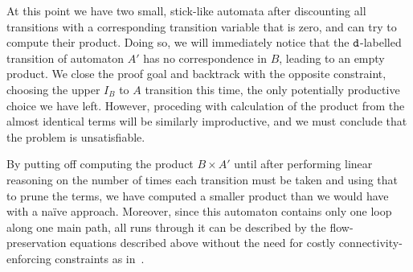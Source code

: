 At this point we have two small, stick-like automata after discounting all
transitions with a corresponding transition variable that is zero, and can try
to compute their product. Doing so, we will immediately notice that the
$\texttt{d}$-labelled transition of automaton $A'$ has no correspondence in $B$,
leading to an empty product. We close the proof goal and backtrack with the
opposite constraint, choosing the upper $I_B$ to $A$ transition this time, the
only potentially productive choice we have left. However, proceding with
calculation of the product from the almost identical terms will be similarly
improductive, and we must conclude that the problem is unsatisfiable.

By putting off computing the product $B \times A'$ until after performing linear
reasoning on the number of times each transition must be taken and using that to
prune the terms, we have computed a smaller product than we would have with a
na\"ive approach. Moreover, since this automaton contains only one loop along
one main path, all runs through it can be described by the flow-preservation
equations described above without the need for costly connectivity-enforcing
constraints as in~\cite{generate-parikh-image}.